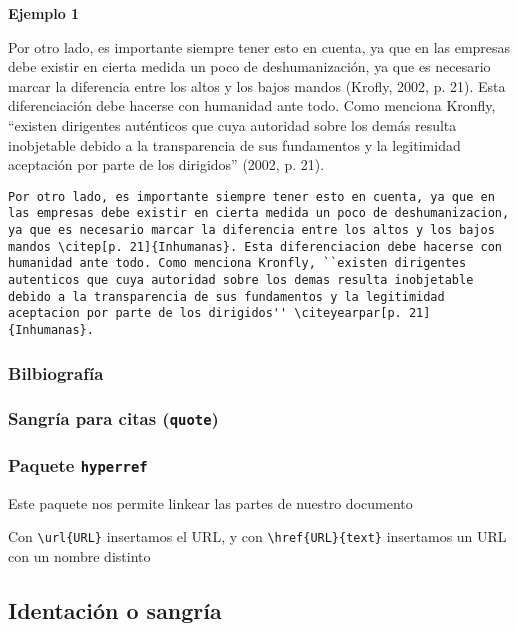 	\textbf{Ejemplo 1}
	
	Por otro lado, es importante siempre tener esto en cuenta, ya que en las empresas debe existir en cierta medida un poco de deshumanización, ya que es necesario marcar la diferencia entre los altos y los bajos mandos (Krofly, 2002, p. 21). Esta diferenciación debe hacerse con humanidad ante todo. Como menciona Kronfly, ``existen dirigentes auténticos que cuya autoridad sobre los demás resulta inobjetable debido a la transparencia de sus fundamentos y la legitimidad aceptación por parte de los dirigidos'' (2002, p. 21).
		
	\begin{myquote}
	 	\begin{lstlisting}
Por otro lado, es importante siempre tener esto en cuenta, ya que en las empresas debe existir en cierta medida un poco de deshumanizacion, ya que es necesario marcar la diferencia entre los altos y los bajos mandos \citep[p. 21]{Inhumanas}. Esta diferenciacion debe hacerse con humanidad ante todo. Como menciona Kronfly, ``existen dirigentes autenticos que cuya autoridad sobre los demas resulta inobjetable debido a la transparencia de sus fundamentos y la legitimidad aceptacion por parte de los dirigidos'' \citeyearpar[p. 21]{Inhumanas}.
	 	\end{lstlisting}
	\end{myquote} 
 
	\subsubsection{Bilbiografía}
	
	\subsubsection{Sangría para citas (\texttt{quote})}
	
	\subsubsection{Paquete \texttt{hyperref}}
	
	Este paquete nos permite linkear las partes de nuestro documento 
	
	Con \verb|\url{URL}| insertamos el URL, y con \verb|\href{URL}{text}| insertamos un URL con un nombre distinto 
	
	\subsection{Identación o sangría}
	
